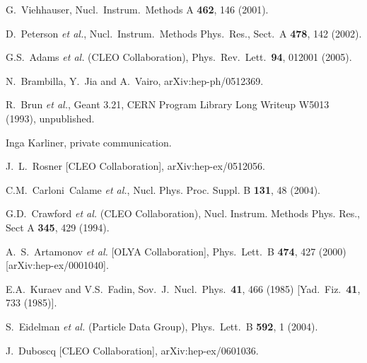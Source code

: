 \documentclass{cornell}
\begin{document}
\begin{thebibliography}{99}
G.~Viehhauser, Nucl.\ Instrum.\ Methods A {\bf 462}, 146 (2001).

D.~Peterson {\it et al.}, Nucl.\ Instrum.\ Methods Phys.\ Res., Sect.\ A {\bf 478}, 142 (2002).

G.S.~Adams {\it et al.}  (CLEO Collaboration),
Phys.\ Rev.\ Lett.\  {\bf 94}, 012001 (2005).

N.~Brambilla, Y.~Jia and A.~Vairo,
  arXiv:hep-ph/0512369.

R.~Brun {\it et al.}, {\textsc Geant} 3.21, CERN Program Library Long
Writeup W5013 (1993), unpublished.

Inga Karliner, private communication.

J.~L.~Rosner  [CLEO Collaboration],
  arXiv:hep-ex/0512056.

C.M.~Carloni~Calame {\sl et al.},
Nucl. Phys. Proc. Suppl. B {\bf 131}, 48 (2004).

G.D.~Crawford {\it et al.} (CLEO Collaboration),
Nucl. Instrum. Methods Phys. Res., Sect A {\bf 345}, 429 (1994).

A.~S.~Artamonov {\it et al.}  [OLYA Collaboration],
  Phys.\ Lett.\ B {\bf 474}, 427 (2000)
  [arXiv:hep-ex/0001040].

E.A.~Kuraev and V.S.~Fadin,
Sov.\ J.\ Nucl.\ Phys.\  {\bf 41}, 466 (1985)
[Yad.\ Fiz.\  {\bf 41}, 733 (1985)].

S.~Eidelman {\it et al.}  (Particle Data Group),
Phys.\ Lett.\ B {\bf 592}, 1 (2004).

J.~Duboscq  [CLEO Collaboration],
  arXiv:hep-ex/0601036.


\end{thebibliography}
\end{document}

